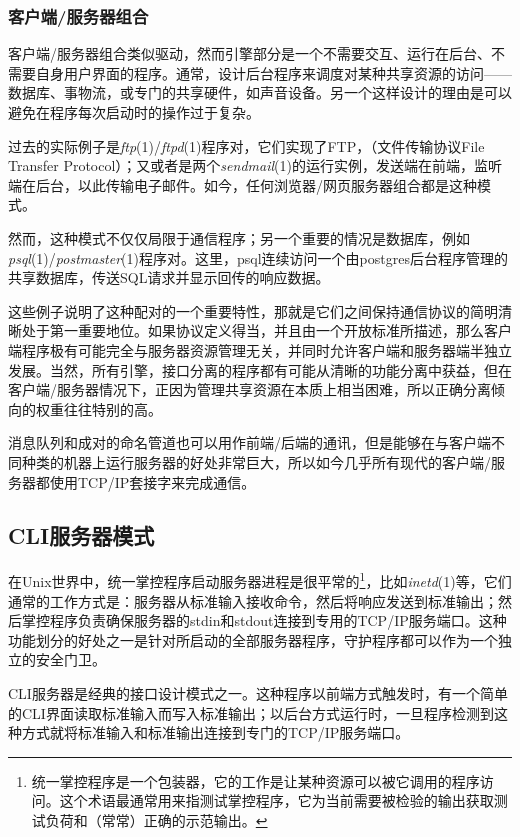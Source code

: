 \documentclass[12pt,oneside]{book}
\begin{document}
\subsubsection{客户端/服务器组合}
客户端/服务器组合类似驱动，然而引擎部分是一个不需要交互、运行在后台、不需要自身用户界面的程序。通常，设计后台程序来调度对某种共享资源的访问——数据库、事物流，或专门的共享硬件，如声音设备。另一个这样设计的理由是可以避免在程序每次启动时的操作过于复杂。

过去的实际例子是\textit{ftp}(1)/\textit{ftpd}(1)程序对，它们实现了FTP，（文件传输协议File Transfer Protocol）；又或者是两个\textit{sendmail}(1)的运行实例，发送端在前端，监听端在后台，以此传输电子邮件。如今，任何浏览器/网页服务器组合都是这种模式。

然而，这种模式不仅仅局限于通信程序；另一个重要的情况是数据库，例如\textit{psql}(1)/\textit{postmaster}(1)程序对。这里，psql连续访问一个由postgres后台程序管理的共享数据库，传送SQL请求并显示回传的响应数据。

这些例子说明了这种配对的一个重要特性，那就是它们之间保持通信协议的简明清晰处于第一重要地位。如果协议定义得当，并且由一个开放标准所描述，那么客户端程序极有可能完全与服务器资源管理无关，并同时允许客户端和服务器端半独立发展。当然，所有引擎，接口分离的程序都有可能从清晰的功能分离中获益，但在客户端/服务器情况下，正因为管理共享资源在本质上相当困难，所以正确分离倾向的权重往往特别的高。

消息队列和成对的命名管道也可以用作前端/后端的通讯，但是能够在与客户端不同种类的机器上运行服务器的好处非常巨大，所以如今几乎所有现代的客户端/服务器都使用TCP/IP套接字来完成通信。

\subsection{CLI服务器模式}
在Unix世界中，统一掌控程序启动服务器进程是很平常的\footnote{统一掌控程序是一个包装器，它的工作是让某种资源可以被它调用的程序访问。这个术语最通常用来指测试掌控程序，它为当前需要被检验的输出获取测试负荷和（常常）正确的示范输出。}，比如\textit{inetd}(1)等，它们通常的工作方式是：服务器从标准输入接收命令，然后将响应发送到标准输出；然后掌控程序负责确保服务器的stdin和stdout连接到专用的TCP/IP服务端口。这种功能划分的好处之一是针对所启动的全部服务器程序，守护程序都可以作为一个独立的安全门卫。

CLI服务器是经典的接口设计模式之一。这种程序以前端方式触发时，有一个简单的CLI界面读取标准输入而写入标准输出；以后台方式运行时，一旦程序检测到这种方式就将标准输入和标准输出连接到专门的TCP/IP服务端口。
\end{document}
